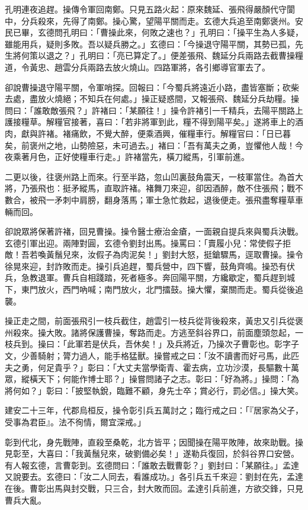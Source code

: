 孔明連夜追趕。操傳令軍回南鄭。只見五路火起：原來魏延、張飛得嚴顏代守閬中，分兵殺來，先得了南鄭。操心驚，望陽平關而走。玄德大兵追至南鄭褒州。安民已畢，玄德問孔明曰：「曹操此來，何敗之速也？」孔明曰：「操平生為人多疑，雖能用兵，疑則多敗。吾以疑兵勝之。」玄德曰：「今操退守陽平關，其勢已孤，先生將何策以退之？」孔明曰：「亮已算定了。」便差張飛、魏延分兵兩路去截曹操糧道，令黃忠、趙雲分兵兩路去放火燒山。四路軍將，各引鄉導官軍去了。

卻說曹操退守陽平關，令軍哨探。回報曰：「今蜀兵將遠近小路，盡皆塞斷；砍柴去處，盡放火燒絕；不知兵在何處。」操正疑惑間，又報張飛、魏延分兵劫糧。操問曰：「誰敢敵張飛？」許褚曰：「某願往！」操令許褚引一千精兵，去陽平關路上護接糧草。解糧官接著，喜曰：「若非將軍到此，糧不得到陽平矣。」遂將車上的酒肉，獻與許褚。褚痛飲，不覺大醉，便乘酒興，催糧車行。解糧官曰：「日已暮矣，前褒州之地，山勢險惡，未可過去。」褚曰：「吾有萬夫之勇，豈懼他人哉！今夜乘著月色，正好使糧車行走。」許褚當先，橫刀縱馬，引軍前進。

二更以後，往褒州路上而來。行至半路，忽山凹裏鼓角震天，一枝軍當住。為首大將，乃張飛也：挺矛縱馬，直取許褚。褚舞刀來迎，卻因酒醉，敵不住張飛；戰不數合，被飛一矛刺中肩膀，翻身落馬；軍士急忙救起，退後便走。張飛盡奪糧草車輛而回。

卻說眾將保著許褚，回見曹操。操令醫士療治金瘡，一面親自提兵來與蜀兵決戰。玄德引軍出迎。兩陣對圓，玄德令劉封出馬。操罵曰：「賣履小兒：常使假子拒敵！吾若喚黃鬚兒來，汝假子為肉泥矣！」劉封大怒，挺鎗驟馬，逕取曹操。操令徐晃來迎，封詐敗而走。操引兵追趕，蜀兵營中，四下響，鼓角齊鳴。操恐有伏兵，急教退軍。曹兵自相踐踏，死者極多。奔回陽平關，方纔歇定，蜀兵趕到城下，東門放火，西門吶喊；南門放火，北門擂鼓。操大懼，棄關而走。蜀兵從後追襲。

操正走之間，前面張飛引一枝兵截住，趙雲引一枝兵從背後殺來，黃忠又引兵從褒州殺來。操大敗。諸將保護曹操，奪路而走。方逃至斜谷界口，前面塵頭忽起，一枝兵到。操曰：「此軍若是伏兵，吾休矣！」及兵將近，乃操次子曹彰也。彰字子文，少善騎射；膂力過人，能手格猛獸。操嘗戒之曰：「汝不讀書而好弓馬，此匹夫之勇，何足貴乎？」彰曰：「大丈夫當學衛青、霍去病，立功沙漠，長驅數十萬眾，縱橫天下；何能作博士耶？」操嘗問諸子之志。彰曰：「好為將。」操問：「為將何如？」彰曰：「披堅執銳，臨難不顧，身先士卒；賞必行，罰必信。」操大笑。

建安二十三年，代郡烏桓反，操令彰引兵五萬討之；臨行戒之曰：「『居家為父子，受事為君臣』。法不徇情，爾宜深戒。」

彰到代北，身先戰陣，直殺至桑乾，北方皆平；因聞操在陽平敗陣，故來助戰。操見彰至，大喜曰：「我黃鬚兒來，破劉備必矣！」遂勒兵復回，於斜谷界口安營。有人報玄德，言曹彰到。玄德問曰：「誰敢去戰曹彰？」劉封曰：「某願往。」孟達又說要去。玄德曰：「汝二人同去，看誰成功。」各引兵五千來迎：劉封在先，孟達在後。曹彰出馬與封交戰，只三合，封大敗而回。孟達引兵前進，方欲交鋒，只見曹兵大亂。

